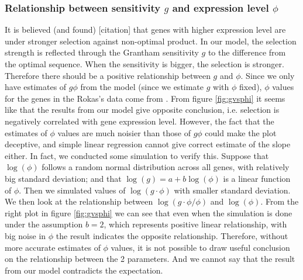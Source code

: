 \subsubsection{Relationship between sensitivity $g$ and expression level $\phi$}
It is believed (and found) [citation] that genes with higher expression level are under stronger selection against non-optimal product. 
In our model, the selection strength is reflected through the Grantham sensitivity $g$ to the difference from the optimal sequence. 
When the sensitivity is bigger, the selection is stronger. 
Therefore there should be a positive relationship between $g$ and $\phi$. 
Since we only have estimates of $g\phi$ from the model (since we estimate $g$ with $\phi$ fixed), $\phi$ values for the genes in the Rokas's data come from \cite{Gilchrist2007}. 
From figure \ref{fig:gvsphi} it seems like that the results from our model give opposite conclusion, i.e. selection is negatively correlated with gene expression level. 
However, the fact that the estimates of $\phi$ values are much noisier than those of $g\phi$ could make the plot deceptive, and simple linear regression cannot give correct estimate of the slope either. 
In fact, we conducted some simulation to verify this. 
Suppose that $\log(\phi)$ follows a random normal distribution across all genes, with relatively big standard deviation; and that $\log (g) = a + b\log(\phi)$ is a linear function of $\phi$. 
Then we simulated values of $\log(g\cdot \phi)$ with smaller standard deviation. 
We then look at the relationship between $\log(g\cdot\phi/\phi)$ and $\log(\phi)$. 
From the right plot in figure \ref{fig:gvsphi} we can see that even when the simulation is done under the assumption $b=2$, which represents positive linear relationship, with big noise in $\phi$ the result indicates the opposite relationship. 
Therefore, without more accurate estimates of $\phi$ values, it is not possible to draw useful conclusion on the relationship between the 2 parameters.
And we cannot say that the result from our model contradicts the expectation.

